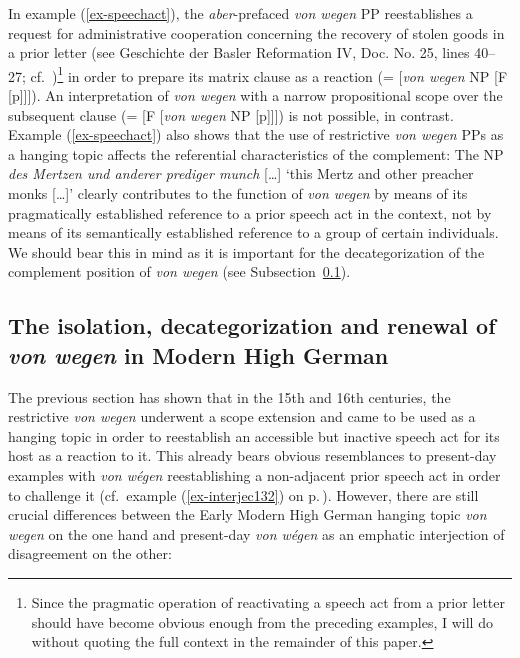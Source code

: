 \documentclass[output=paper
  ,nobabel
  ,draftmode
  ,babelshorthands
  ,colorlinks, citecolor=brown
]{langscibook}
\begin{document}
\noindent
In example (\ref{ex-speechact}), the \emph{aber}-prefaced \emph{von wegen} PP reestablishes a request for administrative cooperation concerning the recovery of stolen goods in a prior letter (see Geschichte der Basler Reformation IV, Doc. No. 25, lines 40--27; cf.\ \citealt[26--27]{Roth1941})\footnote{Since the pragmatic operation of reactivating a speech act from a prior letter should have become obvious enough from the preceding examples, I will do without quoting the full context in the remainder of this paper.}  
in order to prepare its matrix clause as a reaction (= [\emph{von wegen} NP [F [p]]]). An interpretation of \emph{von wegen} with a narrow propositional scope over the subsequent clause (= [F [\emph{von wegen} NP [p]]]) is not possible, in contrast. Example (\ref{ex-speechact}) also shows that the use of restrictive \emph{von wegen} PPs as a hanging topic affects the referential characteristics of the complement: The NP \emph{des Mertzen und anderer prediger munch} [\ldots] `this Mertz and other preacher monks [\ldots]' clearly contributes to the function of \emph{von wegen} by means of its pragmatically established reference to a prior speech act in the context, not by means of its semantically established reference to a group of certain individuals. We should bear this in mind as it is important for the decategorization of the complement position of \emph{von wegen} (see Subsection~\ref{ssec-mhd-vw}).

\subsection{The isolation, decategorization and renewal of \emph{von wegen} in Modern High German}\label{ssec-mhd-vw}

The previous section has shown that in the 15th and 16th centuries, the restrictive \emph{von wegen}
underwent a scope extension and came to be used as a hanging topic in order to reestablish an
accessible but inactive speech act for its host as a reaction to it. This already bears obvious
resemblances to present-day  examples with \emph{von wégen} reestablishing a non-adjacent
prior speech act in order to challenge it (cf.\ example (\ref{ex-interjec132}) on p.\,\pageref{ex-interjec132}). However, there are still crucial differences between the Early Modern High German hanging topic \emph{von wegen} on the one hand and present-day  \emph{von wégen} as an emphatic interjection of disagreement on the other:
\end{document}
